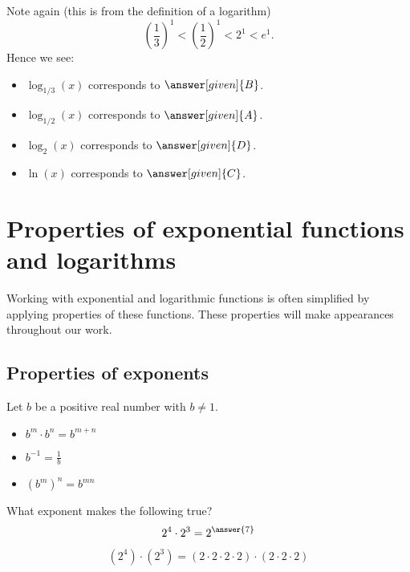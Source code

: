 \documentclass{ximera}
\begin{document}
\begin{example}
\begin{explanation}
\begin{image}
    \end{image}
    Note again (this is from the definition of a logarithm)
    \[
    \left(\frac{1}{3}\right)^1 < \left(\frac{1}{2}\right)^1  < 2^1 < e^1.
    \]
    Hence we see:
    \begin{itemize}
    \item $\log_{1/3}(x)$ corresponds to $\answer[given]{B}$.
    \item $\log_{1/2}(x)$ corresponds to $\answer[given]{A}$.
    \item $\log_2(x)$ corresponds to $\answer[given]{D}$.
    \item $\ln(x)$ corresponds to $\answer[given]{C}$.
    \end{itemize}
  \end{explanation}
\end{example}



\section{Properties of exponential functions and logarithms}

Working with exponential and logarithmic functions is often simplified by  
applying properties of these functions.  These properties will make appearances 
throughout our work.

\subsection{Properties of exponents}
Let $b$ be a positive real number with $b\neq 1$.
\begin{itemize}
  \item $b^m\cdot b^n = b^{m+n}$
  \item $b^{-1} = \frac{1}{b}$
  \item $\left(b^m\right)^n = b^{mn}$
\end{itemize}
\begin{question}
  What exponent makes the following true?
  \[
  2^4 \cdot 2^3 = 2^{\answer{7}}
  \]
  \begin{hint}
    \[
    (2^4) \cdot (2^3) = (2 \cdot 2\cdot 2 \cdot 2) \cdot  (2 \cdot 2\cdot 2)
    \]
  \end{hint}
\end{question}
\end{document}
